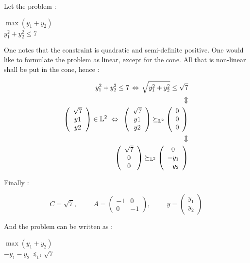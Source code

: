 \documentclass[10pt,a4paper]{article}
\begin{document}
\begin{example}
Let the problem :
\begin{center}
$\max (y_1+y_2)$ \\
$y_1^2+y_2^2 \leq 7$
\end{center}

One notes that the constraint is quadratic and semi-definite positive. One would like to formulate the problem as linear, except for the cone. All that is non-linear shall be put in the cone, hence : 

\begin{align*}
y_1^2+y_2^2 \leq 7 \, 
\Leftrightarrow \, 
\sqrt{y_1^2+y_2^2} \leq \sqrt{7} \\ \vspace{0.5cm}
\Updownarrow \\ \vspace{0.5cm}
\left( \begin{array}{c}
\sqrt7 \\
y1\\
y2 \end{array} \right) 
\in \mathbb{L}^2 \
\Leftrightarrow \, 
\
\left( \begin{array}{c}
\sqrt7 \\
y1\\
y2 \end{array} \right) 
\succeq_{ \mathbb{L}^2}
\left( \begin{array}{c}
0\\
0\\
0\\\end{array} \right)  \\ \vspace{0.5cm}
\Updownarrow \\ \vspace{0.5cm}
\left( \begin{array}{c}
\sqrt7 \\
0\\
0 \end{array} \right) 
\succeq_{ \mathbb{L}^2}
\left( \begin{array}{c}
0 \\
-y_1\\
-y_2 \end{array} \right) 
\end{align*} 


Finally :

\begin{center}
\[
C =\sqrt7, 
\hspace{1cm}
A = \left( \begin{array}{cc}
-1 & 0 \\
0 & -1 \end{array} \right), 
\hspace{1cm}
y = \left( \begin{array}{c}
y_1 \\
y_2 \end{array} \right)
\]
\end{center}
And the problem can be written as : 
\begin{center}
$\max (y_1+y_2)$ \\
$-y_1-y_2 \preceq_{\mathbb{L}^2} \sqrt7$



\end{center}
\end{example}
\end{document}
